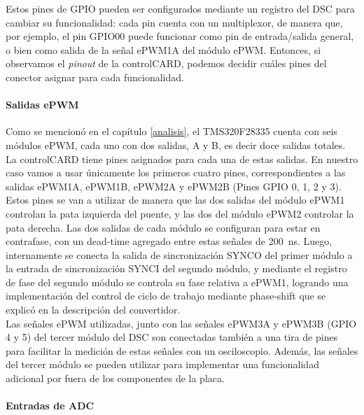 Estos pines de GPIO pueden ser configurados mediante un registro del DSC para cambiar su funcionalidad: cada pin cuenta con un multiplexor, de manera que, por ejemplo, el pin GPIO00 puede funcionar como pin de entrada/salida general, o bien como salida de la señal ePWM1A del módulo ePWM. Entonces, si observamos el \textit{pinout} de la controlCARD, podemos decidir cuáles pines del conector asignar para cada funcionalidad.\\

\paragraph{Salidas ePWM}

Como se mencionó en el capítulo \ref{analisis}, el TMS320F28335 cuenta con seis módulos ePWM, cada uno con dos salidas, A y B, es decir doce salidas totales. La controlCARD tiene pines asignados para cada una de estas salidas. En nuestro caso vamos a usar únicamente los primeros cuatro pines, correspondientes a las salidas ePWM1A, ePWM1B, ePWM2A y ePWM2B (Pines GPIO 0, 1, 2 y 3).\\

Estos pines se van a utilizar de manera que las dos salidas del módulo ePWM1 controlan la pata izquierda del puente, y las dos del módulo ePWM2 controlar la pata derecha. Las dos salidas de cada módulo se configuran para estar en contrafase, con un dead-time agregado entre estas señales de \SI[]{200}{\nano\second}. Luego, internamente se conecta la salida de sincronización SYNCO del primer módulo a la entrada de sincronización SYNCI del segundo módulo, y mediante el registro de fase del segundo módulo se controla su fase relativa a ePWM1, logrando una implementación del control de ciclo de trabajo mediante phase-shift que se explicó en la descripción del convertidor.\\

Las señales ePWM utilizadas, junto con las señales ePWM3A y ePWM3B (GPIO 4 y 5) del tercer módulo del DSC son conectadas también a una tira de pines para facilitar la medición de estas señales con un osciloscopio. Además, las señales del tercer módulo se pueden utilizar para implementar una funcionalidad adicional por fuera de los componentes de la placa.\\

\paragraph{Entradas de ADC}

